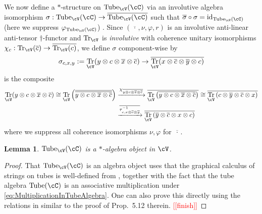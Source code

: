 \documentclass[11pt]{article}
\theoremstyle{plain}
\newtheorem{lem}[thm]{Lemma}
\theoremstyle{definition}
\DeclareMathOperator{\id}{id}
\DeclareMathOperator{\Tr}{Tr}
\DeclareMathOperator{\Tube}{Tube}
\newcommand{\nn}[1]{\textcolor{red}{[[#1]]}}
\begin{document}
We now define a $*$-structure on $\Tube_\cV(\cC)$ via an involutive algebra isomorphism $\sigma: \Tube_\cV(\cC) \to \overline{\Tube_\cV(\cC)}$ such that $\overline{\sigma}\circ \sigma = \id_{\Tube_\cV(\cC)}$ (here we suppress $\varphi_{\Tube_\cV(\cC)}$) \cite[Prop.~3.19]{MR3687214}.
Since $(\overline{\,\cdot\,},\nu,\varphi,r)$ is an involutive anti-linear anti-tensor $\dag$-functor and $\Tr_\cV$ is \emph{involutive} \cite{uAPA} with coherence unitary isomorphisms $\chi_c : \Tr_\cV(\overline{c}) \to \overline{\Tr_\cV(c)}$, we define $\sigma$ component-wise by
$$
\sigma_{c,x,y}:= 
\Tr_\cV(y\otimes c\otimes \overline{x}\otimes \overline{c})
\to
\overline{\Tr_\cV(x\otimes \overline{c}\otimes \overline{y}\otimes c)}
$$
is the composite
\begin{align*}
\Tr_\cV(y\otimes c\otimes \overline{x}\otimes \overline{c})
\cong
\Tr_\cV\left(\overline{\overline{y\otimes c\otimes \overline{x}\otimes \overline{c}}}\right)
&\xrightarrow{\chi_{\overline{y\otimes c\otimes \overline{x}\otimes \overline{c}}}}
\overline{\Tr_\cV\left(\overline{y\otimes c\otimes \overline{x}\otimes \overline{c}}\right)}
\cong
\overline{\Tr_\cV\left(c\otimes \overline{y}\otimes \overline{c}\otimes x\right)}
\\&\xrightarrow{\overline{\tau^{-1}_{c, x\otimes \overline{c}\otimes \overline{y}}}}
\overline{\Tr_\cV\left(\overline{y}\otimes \overline{c}\otimes x\otimes c\right)}
\end{align*}
where we suppress all coherence isomorphisms $\nu,\varphi$ for $\overline{\,\cdot\,}$.

\begin{lem}
$\Tube_\cV(\cC)$ is a $*$-algebra object in $\cV$.
\end{lem}
\begin{proof}
That $\Tube_\cV(\cC)$ is an algebra object uses that the graphical calculus of strings on tubes is well-defined from \cite{1607.06041}, together with the fact that the tube algebra $\Tube(\cC)$ is an associative multiplication under \eqref{eq:MultiplicationInTubeAlgebra}.
One can also prove this directly using the relations in \cite{MR3578212} similar to the proof of Prop.~5.12 therein.
\nn{finish}
\end{proof}
\end{document}

